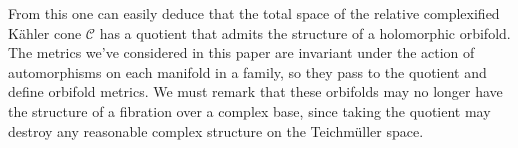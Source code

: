 \documentclass[11pt,a4paper]{amsart}
\theoremstyle{definition}
\theoremstyle{remark}
\def\KC{C}
\def\RKC{\mathcal{\KC}}
\begin{document}
From this one can easily deduce that the total space of the relative
complexified K\"ahler cone $\RKC$ has a quotient that admits the
structure of a holomorphic orbifold. The metrics we've considered in
this paper are invariant under the action of automorphisms on each
manifold in a family, so they pass to the quotient and define orbifold
metrics. We must remark that these orbifolds may no longer have the
structure of a fibration over a complex base, since taking the quotient
may destroy any reasonable complex structure on the Teichm\"{u}ller
space.








\end{document}

